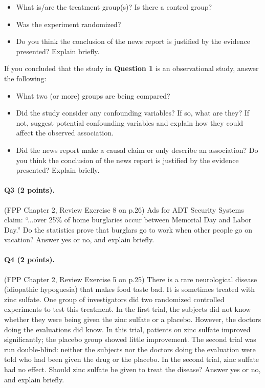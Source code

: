 \documentclass[11pt]{article}
\begin{document}
\begin{itemize}
    \item What is/are the treatment group(s)? Is there a control group?
    \item Was the experiment randomized?
    \item Do you think the conclusion of the news report is justified by the evidence presented? Explain briefly.
\end{itemize}
If you concluded that the study in \textbf{Question 1} is an observational study, answer the following:
\begin{itemize}
    \item What two (or more) groups are being compared?
    \item Did the study consider any confounding variables? If so, what are they? If not, suggest potential confounding variables and explain how they could affect the observed association.
    \item Did the news report make a causal claim or only describe an association? Do you think the conclusion of the news report is justified by the evidence presented? Explain briefly.
\end{itemize}

\paragraph{Q3 (2 points).} (FPP Chapter 2, Review Exercise 8 on p.26) Ads for ADT Security Systems claim: “...over 25\% of home burglaries occur between Memorial Day and Labor Day.”  
Do the statistics prove that burglars go to work when other people go on vacation?  
Answer yes or no, and explain briefly.

\paragraph{Q4 (2 points).} (FPP Chapter 2, Review Exercise 5 on p.25) There is a rare neurological disease (idiopathic hypoguesia) that makes food taste bad. It is sometimes treated with zinc sulfate. One group of investigators did two randomized controlled experiments to test this treatment. In the first trial, the subjects did not know whether they were being given the zinc sulfate or a placebo. However, the doctors doing the evaluations did know. In this trial, patients on zinc sulfate improved significantly; the placebo group showed little improvement. The second trial was run double-blind: neither the subjects nor the doctors doing the evaluation were told who had been given the drug or the placebo. In the second trial, zinc sulfate had no effect. Should zinc sulfate be given to treat the disease? Answer yes or no, and explain briefly.
\end{document}
